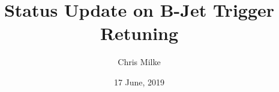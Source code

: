 \documentclass{beamer}
\begin{document}
\title{Status Update on B-Jet Trigger Retuning}   
\author{Chris Milke} 
\date{17 June, 2019} 

\frame{\titlepage} 



%
%
\end{document}
